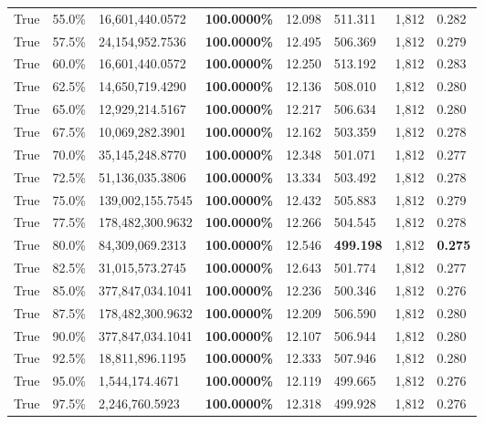 \begin{table}[H]
\begin{tabular}{lllrllll}
\cline{1-8}
True & 55.0\% & 16,601,440.0572 & \bfseries \color{red} 100.0000\% & 12.098 & 511.311 & 1,812 & 0.282 \\
\cline{1-8}
True & 57.5\% & 24,154,952.7536 & \bfseries \color{red} 100.0000\% & 12.495 & 506.369 & 1,812 & 0.279 \\
\cline{1-8}
True & 60.0\% & 16,601,440.0572 & \bfseries \color{red} 100.0000\% & 12.250 & 513.192 & 1,812 & 0.283 \\
\cline{1-8}
True & 62.5\% & 14,650,719.4290 & \bfseries \color{red} 100.0000\% & 12.136 & 508.010 & 1,812 & 0.280 \\
\cline{1-8}
True & 65.0\% & 12,929,214.5167 & \bfseries \color{red} 100.0000\% & 12.217 & 506.634 & 1,812 & 0.280 \\
\cline{1-8}
True & 67.5\% & 10,069,282.3901 & \bfseries \color{red} 100.0000\% & 12.162 & 503.359 & 1,812 & 0.278 \\
\cline{1-8}
True & 70.0\% & 35,145,248.8770 & \bfseries \color{red} 100.0000\% & 12.348 & 501.071 & 1,812 & 0.277 \\
\cline{1-8}
True & 72.5\% & 51,136,035.3806 & \bfseries \color{red} 100.0000\% & 13.334 & 503.492 & 1,812 & 0.278 \\
\cline{1-8}
True & 75.0\% & 139,002,155.7545 & \bfseries \color{red} 100.0000\% & 12.432 & 505.883 & 1,812 & 0.279 \\
\cline{1-8}
True & 77.5\% & 178,482,300.9632 & \bfseries \color{red} 100.0000\% & 12.266 & 504.545 & 1,812 & 0.278 \\
\cline{1-8}
True & 80.0\% & 84,309,069.2313 & \bfseries \color{red} 100.0000\% & 12.546 & \bfseries \color{red} 499.198 & 1,812 & \bfseries \color{red} 0.275 \\
\cline{1-8}
True & 82.5\% & 31,015,573.2745 & \bfseries \color{red} 100.0000\% & 12.643 & 501.774 & 1,812 & 0.277 \\
\cline{1-8}
True & 85.0\% & 377,847,034.1041 & \bfseries \color{red} 100.0000\% & 12.236 & 500.346 & 1,812 & 0.276 \\
\cline{1-8}
True & 87.5\% & 178,482,300.9632 & \bfseries \color{red} 100.0000\% & 12.209 & 506.590 & 1,812 & 0.280 \\
\cline{1-8}
True & 90.0\% & 377,847,034.1041 & \bfseries \color{red} 100.0000\% & 12.107 & 506.944 & 1,812 & 0.280 \\
\cline{1-8}
True & 92.5\% & 18,811,896.1195 & \bfseries \color{red} 100.0000\% & 12.333 & 507.946 & 1,812 & 0.280 \\
\cline{1-8}
True & 95.0\% & 1,544,174.4671 & \bfseries \color{red} 100.0000\% & 12.119 & 499.665 & 1,812 & 0.276 \\
\cline{1-8}
True & 97.5\% & 2,246,760.5923 & \bfseries \color{red} 100.0000\% & 12.318 & 499.928 & 1,812 & 0.276 \\
\cline{1-8}
\bottomrule
\end{tabular}
\end{table}
